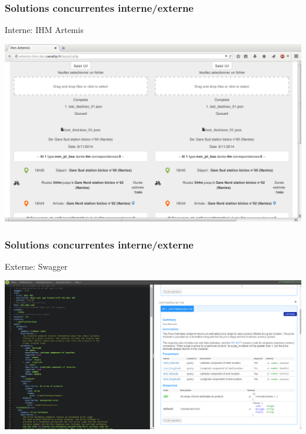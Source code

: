 \documentclass[table]{beamer}
\begin{document}
\begin{frame}
  \frametitle{Solutions concurrentes interne/externe}
  \begin{description}
    \item[Interne: IHM Artemis]
  \end{description}
  \centering\includegraphics[width=\linewidth]{images/ihm-artemis}
\end{frame}

\begin{frame}
  \frametitle{Solutions concurrentes interne/externe}
  \begin{description}
    \item[Externe: Swagger]
  \end{description}
  \centering\includegraphics[width=\linewidth]{images/swagger}
\end{frame}
\end{document}
